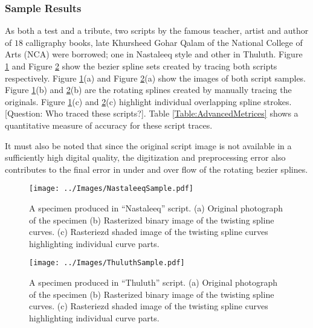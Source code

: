 \subsubsection{Sample Results}
As both a test and a tribute, two scripts by the famous teacher, artist and author of $18$ calligraphy books, late Khursheed Gohar Qalam \cite{bib23} of the National College of Arts (NCA) were borrowed; one in Nastaleeq style and other in Thuluth. Figure \ref{Fig:Nastaleeq} and Figure \ref{Fig:Thuluth} show the bezier spline sets created by tracing both scripts respectively. Figure \ref{Fig:Nastaleeq}(a) and Figure \ref{Fig:Thuluth}(a) show the images of both script samples. Figure \ref{Fig:Nastaleeq}(b) and \ref{Fig:Thuluth}(b) are the rotating splines created by manually tracing the originals. Figure \ref{Fig:Nastaleeq}(c) and \ref{Fig:Thuluth}(c) highlight individual overlapping spline strokes. [Question: Who traced these scripts?]. Table \ref{Table:AdvancedMetrices} shows a quantitative measure of accuracy for these script traces.

It must also be noted that since the original script image is not available in a sufficiently high digital quality, the digitization and preprocessing error also contributes to the final error in under and over flow of the rotating bezier splines.

    \begin{figure}[!t]
    \centering
    \texttt{[image: ../Images/NastaleeqSample.pdf]}
      \caption{
        A specimen produced in ``Nastaleeq'' script. (a) Original photograph of the specimen (b) Rasterized binary image of the twisting spline curves. (c) Rasteriezd shaded image of the twisting spline curves highlighting individual curve parts.}
      \label{Fig:Nastaleeq}
    \end{figure}


    \begin{figure}[!t]
    \centering
    \texttt{[image: ../Images/ThuluthSample.pdf]}
    \caption{
        A specimen produced in ``Thuluth'' script. (a) Original photograph of the specimen (b) Rasterized binary image of the twisting spline curves. (c) Rasteriezd shaded image of the twisting spline curves highlighting individual curve parts.
    }
  \label{Fig:Thuluth}
\end{figure}

